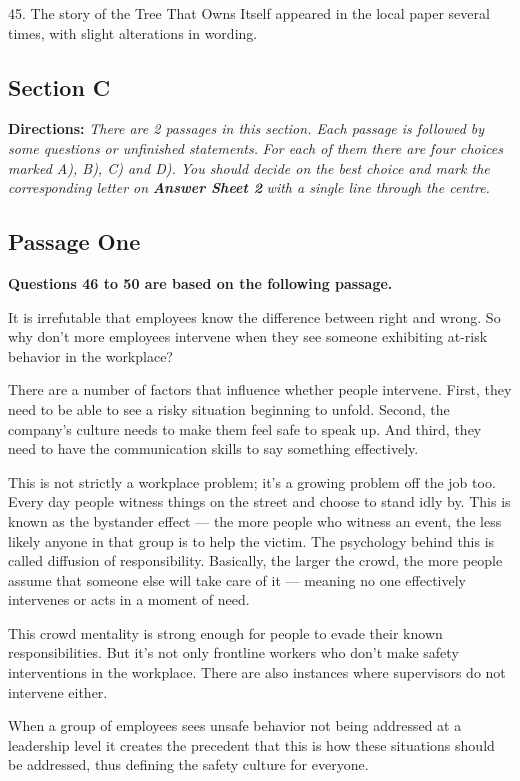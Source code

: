 \documentclass[UTF8,11pt]{ctexart}
\begin{document}
45. The story of the Tree That Owns Itself appeared in the local paper several times, with slight alterations in wording.


\subsection*{\textbf{Section C}}


\textbf{Directions: }\textit{There are 2 passages in this section. Each passage is followed by some questions or unfinished statements.} \textit{For each of them there are four choices marked A), B), C) and D). You should decide on the best choice and mark the} \textit{corresponding letter on }\textbf{\textit{Answer Sheet 2}}\textit{ with a single line through the centre.}


\subsection*{\textbf{Passage One}}


\textbf{Questions 46 to 50 are based on the following passage.}


It is irrefutable that employees know the difference between right and wrong. So why don’t more employees intervene when they see someone exhibiting at-risk behavior in the workplace?


There are a number of factors that influence whether people intervene. First, they need to be able to see a risky situation beginning to unfold. Second, the company’s culture needs to make them feel safe to speak up. And third, they need to have the communication skills to say something effectively.


This is not strictly a workplace problem; it’s a growing problem off the job too. Every day people witness things on the street and choose to stand idly by. This is known as the bystander effect — the more people who witness an event, the less likely anyone in that group is to help the victim. The psychology behind this is called diffusion of responsibility. Basically, the larger the crowd, the more people assume that someone else will take care of it — meaning no one effectively intervenes or acts in a moment of need.


This crowd mentality is strong enough for people to evade their known responsibilities. But it's not only frontline workers who don’t make safety interventions in the workplace. There are also instances where supervisors do not intervene either.


When a group of employees sees unsafe behavior not being addressed at a leadership level it creates the precedent that this is how these situations should be addressed, thus defining the safety culture for everyone.
\end{document}
